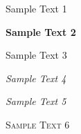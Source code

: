 \documentclass[a4paper,12pt]{article}
\begin{document}
	\newpage
	
	\textmd{Sample Text 1}
	\newline
	
	\textbf{Sample Text 2}
	\newline
	
	\textup{Sample Text 3}
	\newline
	
	\textit{Sample Text 4}
	\newline
	
	\textsl{Sample Text 5}
	\newline
	
	\textsc{Sample Text 6}
	\newline        
        
    
\end{document}
